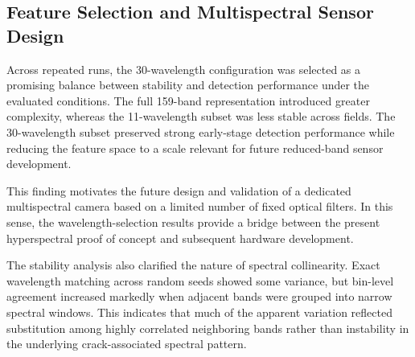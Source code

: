 
\subsection{Feature Selection and Multispectral Sensor Design}
\noindent
Across repeated runs, the 30-wavelength configuration was selected as a promising balance between stability and detection performance under the evaluated conditions. The full 159-band representation introduced greater complexity, whereas the 11-wavelength subset was less stable across fields. The 30-wavelength subset preserved strong early-stage detection performance while reducing the feature space to a scale relevant for future reduced-band sensor development.

\medskip\noindent
This finding motivates the future design and validation of a dedicated multispectral camera based on a limited number of fixed optical filters. In this sense, the wavelength-selection results provide a bridge between the present hyperspectral proof of concept and subsequent hardware development.


\medskip\noindent
The stability analysis also clarified the nature of spectral collinearity. Exact wavelength matching across random seeds showed some variance, but bin-level agreement increased markedly when adjacent bands were grouped into narrow spectral windows. This indicates that much of the apparent variation reflected substitution among highly correlated neighboring bands rather than instability in the underlying crack-associated spectral pattern.


